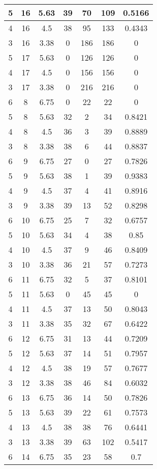\documentclass[letterpaper, 12pt]{article}
\begin{document}
\begin{longtable}{|c|c|c|c|c|c|c|}
\hline
5 & 16 & 5.63 & 39 & 70 & 109 & 0.5166 \\
\hline
4 & 16 & 4.5 & 38 & 95 & 133 & 0.4343 \\
\hline
3 & 16 & 3.38 & 0 & 186 & 186 & 0 \\
\hline
5 & 17 & 5.63 & 0 & 126 & 126 & 0 \\
\hline
4 & 17 & 4.5 & 0 & 156 & 156 & 0 \\
\hline
3 & 17 & 3.38 & 0 & 216 & 216 & 0 \\
\hline
6 & 8 & 6.75 & 0 & 22 & 22 & 0 \\
\hline
5 & 8 & 5.63 & 32 & 2 & 34 & 0.8421 \\
\hline
4 & 8 & 4.5 & 36 & 3 & 39 & 0.8889 \\
\hline
3 & 8 & 3.38 & 38 & 6 & 44 & 0.8837 \\
\hline
6 & 9 & 6.75 & 27 & 0 & 27 & 0.7826 \\
\hline
5 & 9 & 5.63 & 38 & 1 & 39 & 0.9383 \\
\hline
4 & 9 & 4.5 & 37 & 4 & 41 & 0.8916 \\
\hline
3 & 9 & 3.38 & 39 & 13 & 52 & 0.8298 \\
\hline
6 & 10 & 6.75 & 25 & 7 & 32 & 0.6757 \\
\hline
5 & 10 & 5.63 & 34 & 4 & 38 & 0.85 \\
\hline
4 & 10 & 4.5 & 37 & 9 & 46 & 0.8409 \\
\hline
3 & 10 & 3.38 & 36 & 21 & 57 & 0.7273 \\
\hline
6 & 11 & 6.75 & 32 & 5 & 37 & 0.8101 \\
\hline
5 & 11 & 5.63 & 0 & 45 & 45 & 0 \\
\hline
4 & 11 & 4.5 & 37 & 13 & 50 & 0.8043 \\
\hline
3 & 11 & 3.38 & 35 & 32 & 67 & 0.6422 \\
\hline
6 & 12 & 6.75 & 31 & 13 & 44 & 0.7209 \\
\hline
5 & 12 & 5.63 & 37 & 14 & 51 & 0.7957 \\
\hline
4 & 12 & 4.5 & 38 & 19 & 57 & 0.7677 \\
\hline
3 & 12 & 3.38 & 38 & 46 & 84 & 0.6032 \\
\hline
6 & 13 & 6.75 & 36 & 14 & 50 & 0.7826 \\
\hline
5 & 13 & 5.63 & 39 & 22 & 61 & 0.7573 \\
\hline
4 & 13 & 4.5 & 38 & 38 & 76 & 0.6441 \\
\hline
3 & 13 & 3.38 & 39 & 63 & 102 & 0.5417 \\
\hline
6 & 14 & 6.75 & 35 & 23 & 58 & 0.7 \\

\end{longtable}
\end{document}
